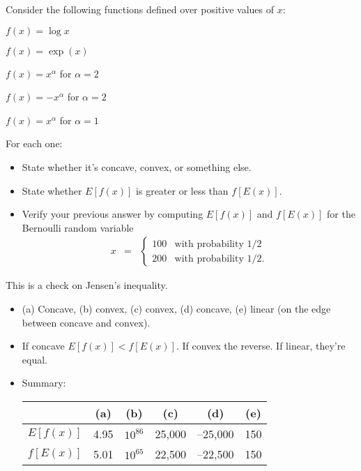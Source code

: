 \documentclass[11pt]{exam}
\begin{document}
\begin{questions}
Consider the following functions defined over positive values of $x$:
%
\begin{parts}
\item $f(x) = \log x$
\item $f(x) = \exp(x) $
\item $f(x) = x^{\alpha}$ for $\alpha = 2$
\item $f(x) = - x^{\alpha}$ for $\alpha = 2$
\item $f(x) = x^{\alpha} $ for $\alpha = 1$
\end{parts}
For each one:
\begin{itemize}
\item State whether it's concave, convex, or something else.
\item State whether $ E[f(x)]$ is greater or less than $f[E(x)]$.
\item Verify your previous answer by computing
 $ E[f(x)]$ and $f[E(x)]$
 for the Bernoulli random variable
\begin{eqnarray*}
    x &=& \left\{
            \begin{array}{ll}
            100   & \mbox{with probability } 1/2 \\
            200 & \mbox{with probability }   1/2 .
            \end{array}
            \right.
\end{eqnarray*}
\end{itemize}

\begin{solution}
This is a check on Jensen's inequality.
\begin{itemize}
\item (a) Concave, (b) convex, (c) convex, (d) concave, (e) linear
(on the edge between concave and convex).
\item If concave $ E[f(x)] < f[E(x)]$.  If convex the reverse.
If linear, they're equal.
\item Summary:
\begin{center}
\begin{tabular}{lccccc}
\toprule
        & (a) & (b) & (c) & (d) & (e) \\
\midrule
$E[f(x)]$ & 4.95 & $10^{86}$ & 25,000 & --25,000 & 150 \\
$f[E(x)]$ & 5.01 & $10^{65}$ & 22,500 & --22,500 & 150 \\
\bottomrule
\end{tabular}
\end{center}
\end{itemize}
\end{solution}


\end{questions}
\end{document}
